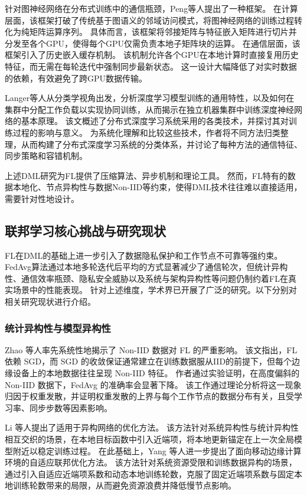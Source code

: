 \documentclass[master, vlined]{DissertUESTC}
\begin{document}
	针对图神经网络在分布式训练中的通信瓶颈，Peng等人提出了一种框架。
	在计算层面，该框架打破了传统基于图语义的邻域访问模式，将图神经网络的训练过程转化为纯矩阵运算序列。
	具体而言，该框架将邻接矩阵与特征嵌入矩阵进行切片并分发至各个GPU，使得每个GPU仅需负责本地子矩阵块的运算。
	在通信层面，该框架引入了历史嵌入缓存机制。
	该机制允许各个GPU在本地计算时直接复用历史特征，而无需在每轮迭代中强制同步最新状态。
	这一设计大幅降低了对实时数据的依赖，有效避免了跨GPU数据传输。

	Langer等人从分类学视角出发，分析深度学习模型训练的通用特性，以及如何在集群中分配工作负载以实现协同训练，从而揭示在独立机器集群中训练深度神经网络的基本原理。
	该文概述了分布式深度学习系统采用的各类技术，并探讨其对训练过程的影响与意义。
	为系统化理解和比较这些技术，作者将不同方法归类整理，从而构建了分布式深度学习系统的分类体系，并讨论了每种方法的通信特征、同步策略和容错机制。

	上述DML研究为FL提供了压缩算法、异步机制和理论工具。
	然而，FL特有的数据本地化、节点异构性与数据Non-IID等约束，使得DML技术往往难以直接适用，需要针对性地设计。

	\subsection{联邦学习核心挑战与研究现状}

	FL在DML的基础上进一步引入了数据隐私保护和工作节点不可靠等强约束。
	FedAvg算法通过本地多轮迭代后平均的方式显著减少了通信轮次，但统计异构性、通信效率瓶颈、隐私安全威胁以及系统与架构异构性等问题仍制约着FL在真实场景中的性能表现。
	针对上述维度，学术界已开展了广泛的研究。以下分别对相关研究现状进行介绍。

	\subsubsection{统计异构性与模型异构性}

	Zhao 等人率先系统性地揭示了 Non-IID 数据对 FL 的严重影响。
	该文指出，FL 依赖 SGD，而 SGD 的收敛保证通常建立在训练数据服从IID的前提下，但每个边缘设备上的本地数据往往呈现 Non-IID 特征。
	作者通过实验证明，在高度偏斜的 Non-IID 数据下，FedAvg 的准确率会显著下降。
	该工作通过理论分析将这一现象归因于权重发散，并证明权重发散的上界与每个工作节点的数据分布有关，且受学习率、同步步数等因素影响。

	Li 等人提出了适用于异构网络的优化方法。
	该方法针对系统异构性与统计异构性相互交织的场景，在本地目标函数中引入近端项，将本地更新锚定在上一次全局模型附近以稳定训练过程。
	在此基础上，Yang 等人进一步提出了面向移动边缘计算环境的自适应联邦优化方法。
	该方法针对系统资源受限和训练数据异构的场景，通过引入自适应近端项系数和动态本地训练轮数，克服了固定近端项系数与固定本地训练轮数带来的局限，从而避免资源浪费并降低慢节点影响。
\end{document}

